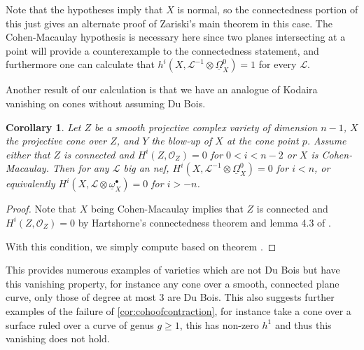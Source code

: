 \documentclass{report}
\newtheorem{cor}[theorem]{Corollary}
\theoremstyle{definition}
\newcommand{\LL}{\mathcal{L}}
\newcommand{\OO}{\mathcal{O}}
\newcommand{\DB}{\underline{\Omega}}
\newcommand{\db}{\underline{\omega}^\bullet}
\begin{document}
Note that the hypotheses imply that $X$ is normal, so the connectedness portion of this just gives an alternate proof of Zariski's main theorem in this case.
The Cohen-Macaulay hypothesis is necessary here since two planes intersecting at a point will provide a counterexample to the connectedness statement, and furthermore one can calculate that $h^i(X, \LL^{-1} \otimes \DB_X^0) = 1$ for every $\LL$.

Another result of our calculation is that we have an analogue of Kodaira vanishing on cones without assuming Du Bois.

\begin{cor}
	Let $Z$ be a smooth projective complex variety of dimension $n-1$, $X$ the projective cone over $Z$, and $Y$ the blow-up of $X$ at the cone point $p$.
	Assume either that $Z$ is connected and $H^i(Z, \OO_Z) = 0$ for $0 < i < n-2$ or $X$ is Cohen-Macaulay.
	Then for any $\LL$ big an nef, $H^i(X, \LL^{-1} \otimes \DB_X^0) = 0$ for $i < n$, or equivalently $H^i(X, \LL \otimes \db_X) = 0$ for $i > -n$.
\end{cor}
\begin{proof}
	Note that $X$ being Cohen-Macaulay implies that $Z$ is connected and $H^i(Z, \OO_Z) = 0$ by Hartshorne's connectedness theorem and lemma 4.3 of \cite{Patakfalvi2013}.
	
	With this condition, we simply compute based on theorem \cite{Patakfalvi2013}.
\end{proof}

This provides numerous examples of varieties which are not Du Bois but have this vanishing property, for instance any cone over a smooth, connected plane curve, only those of degree at most 3 are Du Bois.
This also suggests further examples of the failure of \ref{cor:cohoofcontraction}, for instance take a cone over a surface ruled over a curve of genus $g \geq 1$, this has non-zero $h^1$ and thus this vanishing does not hold.

{}

\end{document}
